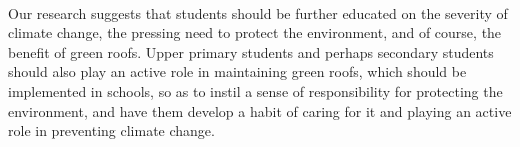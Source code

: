 \documentclass[a4paper]{article}
\begin{document}
\begin{multicols}{2}
  \paragraph{} Our research suggests that students should be further
  educated on the severity of climate change, the pressing need to protect
  the environment, and of course, the benefit of green roofs. Upper
  primary students and perhaps secondary students should also play an
  active role in maintaining green roofs, which should be implemented
  in schools, so as to instil a sense of responsibility for protecting
  the environment, and have them develop a habit of caring for it and
  playing an active role in preventing climate change.


\end{multicols}

\newpage

\printbibliography[heading=bibintoc,title={References}]

\newpage

\end{document}
